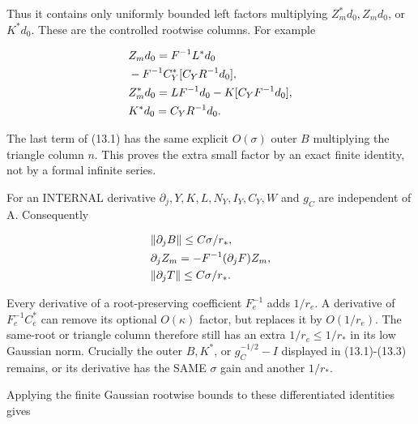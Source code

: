 Thus it contains only uniformly bounded left factors multiplying
\(Z_{m}^{*}d_{0}, Z_{m} d_{0}\), or \(K^{*}d_{0}\). These are the
controlled rootwise columns. For example

\begin{gather*}
\begin{aligned}
& Z_{m} d_{0}=F^{-1}L^{*}d_{0} \\
& -F^{-1}C_{Y}^{*}[C_{Y} R^{-1}d_{0}], \\
& Z_{m}^{*}d_{0}=L F^{-1}d_{0}-K[C_{Y} F^{-1}d_{0}], \\
& K^{*}d_{0}=C_{Y} R^{-1}d_{0}.
\end{aligned}\notag
\end{gather*}

The last term of (13.1) has the same explicit \(O(\sigma )\) outer \(B\)
multiplying the triangle column \(n\). This proves the extra small
factor by an exact finite identity, not by a formal infinite series.

For an INTERNAL derivative
\(\partial _{j}, Y, K, L, N_{Y}, I_{Y}, C_{Y}, W\) and \(g_{C}\) are
independent of A. Consequently

\begin{gather*}
\begin{aligned}
& \Vert \partial _{j} B\Vert \le C \sigma /r_{*}, \\
& \partial _{j} Z_{m}=-F^{-1}(\partial _{j} F)Z_{m}, \\
& \Vert \partial _{j} T\Vert \le C \sigma /r_{*}.
\end{aligned}\notag
\end{gather*}

Every derivative of a root-preserving coefficient \(F_{e}^{-1}\) adds
\(1/r_{e}\). A derivative of \(F_{e}^{-1}C_{e}^{*}\) can remove its
optional \(O(\kappa )\) factor, but replaces it by \(O(1/r_{e})\). The
same-root or triangle column therefore still has an extra
\(1/r_{e}\le 1/r_{*}\) in its low Gaussian norm. Crucially the outer
\(B, K^{*}\), or \(g_{C}^{-1/2}-I\) displayed in (13.1)-(13.3) remains,
or its derivative has the SAME \(\sigma\) gain and another \(1/r_{*}\).

Applying the finite Gaussian rootwise bounds to these differentiated
identities gives

